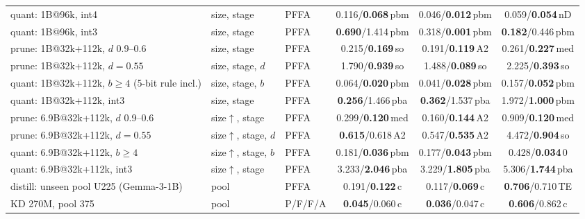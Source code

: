 \begin{table}[!t]
\begin{tabular}{@{}>{\raggedright\arraybackslash}p{4.15cm}>{\raggedright\arraybackslash}p{1.4cm}lccc@{}}
\addlinespace[1.5pt]
quant: 1B@96k, int4 & size, stage & PFFA & 0.116/\textbf{0.068}{\scriptsize\,pbm} & 0.046/\textbf{0.012}{\scriptsize\,pbm} & 0.059/\textbf{0.054}{\scriptsize\,nD} \\
quant: 1B@96k, int3 & size, stage & PFFA & \textbf{0.690}/1.414{\scriptsize\,pbm} & 0.318/\textbf{0.001}{\scriptsize\,pbm} & \textbf{0.182}/0.446{\scriptsize\,pbm} \\
\addlinespace[1.5pt]
prune: 1B@32k+112k, $d$ 0.9--0.6 & size, stage & PFFA & 0.215/\textbf{0.169}{\scriptsize\,so} & 0.191/\textbf{0.119}{\scriptsize\,A2} & 0.261/\textbf{0.227}{\scriptsize\,med} \\
prune: 1B@32k+112k, $d=0.55$ & size, stage, $d$ & PFFA & 1.790/\textbf{0.939}{\scriptsize\,so} & 1.488/\textbf{0.089}{\scriptsize\,so} & 2.225/\textbf{0.393}{\scriptsize\,so} \\
\addlinespace[1.5pt]
quant: 1B@32k+112k, $b\ge4$ (5-bit rule incl.) & size, stage, $b$ & PFFA & 0.064/\textbf{0.020}{\scriptsize\,pbm} & 0.041/\textbf{0.028}{\scriptsize\,pbm} & 0.157/\textbf{0.052}{\scriptsize\,pbm} \\
quant: 1B@32k+112k, int3 & size, stage & PFFA & \textbf{0.256}/1.466{\scriptsize\,pba} & \textbf{0.362}/1.537{\scriptsize\,pba} & 1.972/\textbf{1.000}{\scriptsize\,pbm} \\
\addlinespace[1.5pt]
prune: 6.9B@32k+112k, $d$ 0.9--0.6 & size$\uparrow$, stage & PFFA & 0.299/\textbf{0.120}{\scriptsize\,med} & 0.160/\textbf{0.144}{\scriptsize\,A2} & 0.909/\textbf{0.120}{\scriptsize\,med} \\
prune: 6.9B@32k+112k, $d=0.55$ & size$\uparrow$, stage, $d$ & PFFA & \textbf{0.615}/0.618{\scriptsize\,A2} & 0.547/\textbf{0.535}{\scriptsize\,A2} & 4.472/\textbf{0.904}{\scriptsize\,so} \\
\addlinespace[1.5pt]
quant: 6.9B@32k+112k, $b\ge4$ & size$\uparrow$, stage, $b$ & PFFA & 0.181/\textbf{0.036}{\scriptsize\,pbm} & 0.177/\textbf{0.043}{\scriptsize\,pbm} & 0.428/\textbf{0.034}{\scriptsize\,0} \\
quant: 6.9B@32k+112k, int3 & size$\uparrow$, stage & PFFA & 3.233/\textbf{2.046}{\scriptsize\,pba} & 3.229/\textbf{1.805}{\scriptsize\,pba} & 5.306/\textbf{1.744}{\scriptsize\,pba} \\
\addlinespace[1.5pt]
distill: unseen pool U225 (Gemma-3-1B) & pool & PFFA & 0.191/\textbf{0.122}{\scriptsize\,c} & 0.117/\textbf{0.069}{\scriptsize\,c} & \textbf{0.706}/0.710{\scriptsize\,TE} \\
\addlinespace[1.5pt]
KD 270M, pool 375 & pool & P/F/F/A & \textbf{0.045}/0.060{\scriptsize\,c} & \textbf{0.036}/0.047{\scriptsize\,c} & \textbf{0.606}/0.862{\scriptsize\,c} \\

\end{tabular}
\end{table}
